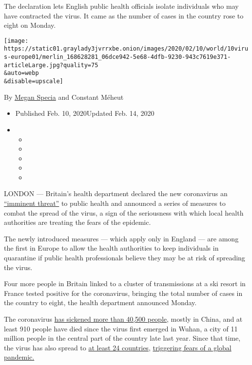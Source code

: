 The declaration lets English public health officials isolate individuals
who may have contracted the virus. It came as the number of cases in the
country rose to eight on Monday.

\texttt{[image: https://static01.graylady3jvrrxbe.onion/images/2020/02/10/world/10virus-europe01/merlin\_168628281\_06dce942-5e68-4dfb-9230-943c7619e371-articleLarge.jpg?quality=75\\\&auto=webp\\\&disable=upscale]}

By \href{https://www.nytimes3xbfgragh.onion/by/megan-specia}{Megan
Specia} and Constant Méheut

\begin{itemize}
\item
  Published Feb. 10, 2020Updated Feb. 14, 2020
\item
  \begin{itemize}
  \item
  \item
  \item
  \item
  \item
  \end{itemize}
\end{itemize}

LONDON --- Britain's health department declared the new coronavirus an
\href{https://www.gov.uk/government/news/secretary-of-state-makes-new-regulations-on-coronavirus}{``imminent
threat''} to public health and announced a series of measures to combat
the spread of the virus, a sign of the seriousness with which local
health authorities are treating the fears of the epidemic.

The newly introduced measures --- which apply only in England --- are
among the first in Europe to allow the health authorities to keep
individuals in quarantine if public health professionals believe they
may be at risk of spreading the virus.

Four more people in Britain linked to a cluster of transmissions at a
ski resort in France tested positive for the coronavirus, bringing the
total number of cases in the country to eight, the health department
announced Monday.

The coronavirus
\href{https://www.nytimes3xbfgragh.onion/interactive/2020/world/asia/china-wuhan-coronavirus-maps.html}{has
sickened more than 40,500 people}, mostly in China, and at least 910
people have died since the virus first emerged in Wuhan, a city of 11
million people in the central part of the country late last year. Since
that time, the virus has also spread to
\href{http://www.nytimes3xbfgragh.onion/2020/02/13/world/asia/china-coronavirus.html}{at
least 24 countries},
\href{https://www.nytimes3xbfgragh.onion/2020/02/02/health/coronavirus-pandemic-china.html}{triggering
fears of a global pandemic.}


